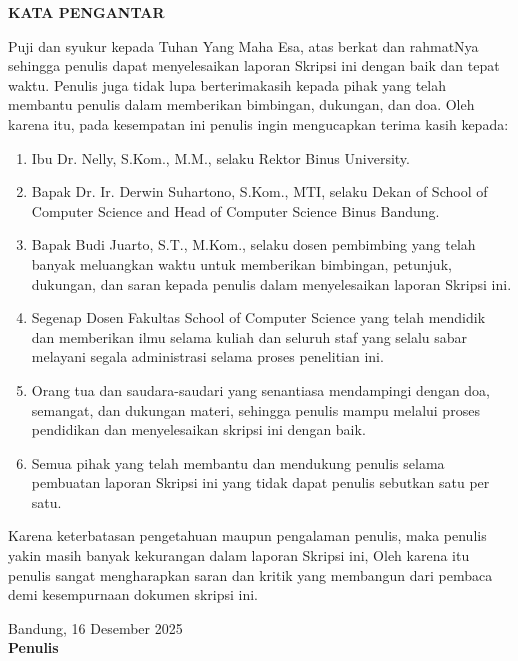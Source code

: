 \clearpage
\thispagestyle{plain}
{}

\begin{center}
{\selectfont\bfseries KATA PENGANTAR}
\end{center}
\vspace{0.5cm}

{\selectfont
Puji dan syukur kepada Tuhan Yang Maha Esa, atas berkat dan rahmatNya sehingga penulis dapat menyelesaikan laporan Skripsi ini dengan baik dan tepat waktu. Penulis juga tidak lupa berterimakasih kepada pihak yang telah membantu penulis dalam memberikan bimbingan, dukungan, dan doa. Oleh karena itu, pada kesempatan ini penulis ingin mengucapkan terima kasih kepada:
\begin{enumerate}
    \item Ibu Dr. Nelly, S.Kom., M.M., selaku Rektor Binus University.
    \item Bapak Dr. Ir. Derwin Suhartono, S.Kom., MTI, selaku Dekan of School of Computer Science and Head of Computer Science Binus Bandung.
    \item Bapak Budi Juarto, S.T., M.Kom., selaku dosen pembimbing yang telah banyak meluangkan waktu untuk memberikan bimbingan, petunjuk, dukungan, dan saran kepada penulis dalam menyelesaikan laporan Skripsi ini.
    \item Segenap Dosen Fakultas School of Computer Science yang telah mendidik dan memberikan ilmu selama kuliah dan seluruh staf yang selalu sabar melayani segala administrasi selama proses penelitian ini.
    \item Orang tua dan saudara-saudari yang senantiasa mendampingi dengan doa, semangat, dan dukungan materi, sehingga penulis mampu melalui proses pendidikan dan menyelesaikan skripsi ini dengan baik.
    \item Semua pihak yang telah membantu dan mendukung penulis selama pembuatan laporan Skripsi ini yang tidak dapat penulis sebutkan satu per satu.
\end{enumerate}

Karena keterbatasan pengetahuan maupun pengalaman penulis, maka penulis yakin masih banyak kekurangan dalam laporan Skripsi ini, Oleh karena itu penulis sangat mengharapkan saran dan kritik yang membangun dari pembaca demi kesempurnaan dokumen skripsi ini.

\vspace{1.5cm}
 
\begin{flushright}
Bandung, 16 Desember 2025\\[2cm] 
\textbf{Penulis}
\end{flushright}
}

\newpage